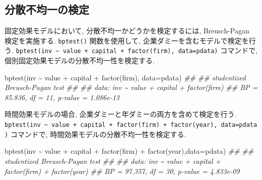 \documentclass[
  letterpaper,
  xelatex,
  ja=standard, xelatex]{bxjsbook}
\newenvironment{Shaded}{\begin{snugshade}}{\end{snugshade}}
\newcommand{\AttributeTok}[1]{\textcolor[rgb]{0.40,0.45,0.13}{#1}}
\newcommand{\DocumentationTok}[1]{\textcolor[rgb]{0.37,0.37,0.37}{\textit{#1}}}
\newcommand{\FunctionTok}[1]{\textcolor[rgb]{0.28,0.35,0.67}{#1}}
\newcommand{\NormalTok}[1]{\textcolor[rgb]{0.00,0.23,0.31}{#1}}
\newcommand{\SpecialCharTok}[1]{\textcolor[rgb]{0.37,0.37,0.37}{#1}}
\begin{document}
\subsection{分散不均一の検定}\label{ux5206ux6563ux4e0dux5747ux4e00ux306eux691cux5b9a-1}

固定効果モデルにおいて, 分散不均一かどうかを検定するには, Breusch-Pagan
検定を実施する. \texttt{bptest()} 関数を使用して,
企業ダミーを含むモデルで検定を行う.
\texttt{bptest(inv\ \textasciitilde{}\ value\ +\ capital\ +\ factor(firm),\ data=pdata)}
コマンドで, 個別固定効果モデルの分散不均一性を検定する.

\begin{Shaded}
\begin{Highlighting}[]
\FunctionTok{bptest}\NormalTok{(inv }\SpecialCharTok{\textasciitilde{}}\NormalTok{ value }\SpecialCharTok{+}\NormalTok{ capital }\SpecialCharTok{+} \FunctionTok{factor}\NormalTok{(firm), }\AttributeTok{data=}\NormalTok{pdata)}
\DocumentationTok{\#\# }
\DocumentationTok{\#\#  studentized Breusch{-}Pagan test}
\DocumentationTok{\#\# }
\DocumentationTok{\#\# data:  inv \textasciitilde{} value + capital + factor(firm)}
\DocumentationTok{\#\# BP = 85.836, df = 11, p{-}value = 1.086e{-}13}
\end{Highlighting}
\end{Shaded}

時間効果モデルの場合, 企業ダミーと年ダミーの両方を含めて検定を行う.
\texttt{bptest(inv\ \textasciitilde{}\ value\ +\ capital\ +\ factor(firm)\ +\ factor(year),\ data=pdata)}
コマンドで, 時間効果モデルの分散不均一性を検定する.

\begin{Shaded}
\begin{Highlighting}[]
\FunctionTok{bptest}\NormalTok{(inv }\SpecialCharTok{\textasciitilde{}}\NormalTok{ value }\SpecialCharTok{+}\NormalTok{ capital }\SpecialCharTok{+} \FunctionTok{factor}\NormalTok{(firm) }\SpecialCharTok{+} \FunctionTok{factor}\NormalTok{(year),}\AttributeTok{data=}\NormalTok{pdata)}
\DocumentationTok{\#\# }
\DocumentationTok{\#\#  studentized Breusch{-}Pagan test}
\DocumentationTok{\#\# }
\DocumentationTok{\#\# data:  inv \textasciitilde{} value + capital + factor(firm) + factor(year)}
\DocumentationTok{\#\# BP = 97.357, df = 30, p{-}value = 4.833e{-}09}
\end{Highlighting}
\end{Shaded}




\printindex
\end{document}
